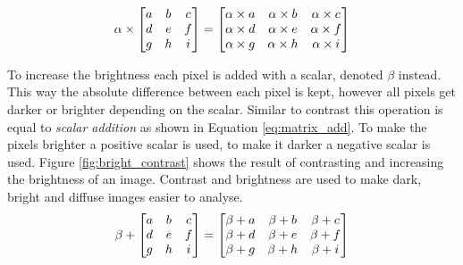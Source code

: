 \begin{equation}
\alpha \times 
\setlength{\arraycolsep}{5pt}
 \begin{bmatrix}
  a & b & c \\
  d & e & f \\
  g & h & i \\
 \end{bmatrix} =
 \setlength{\arraycolsep}{5pt} 
 \begin{bmatrix}
  \alpha \times a & \alpha \times b & \alpha \times c \\
  \alpha \times d & \alpha \times e & \alpha \times f \\
  \alpha \times g & \alpha \times h & \alpha \times i \\
 \end{bmatrix}
 \label{eq:matrix_mul}
\end{equation}

To increase the brightness each pixel is added with a scalar, denoted $\beta$ instead. This way the absolute difference between each pixel is kept, however all pixels get darker or brighter depending on the scalar. Similar to contrast this operation is equal to \textit{scalar addition} as shown in Equation \ref{eq:matrix_add}. To make the pixels brighter a positive scalar is used, to make it darker a negative scalar is used. Figure \ref{fig:bright_contrast} shows the result of contrasting and increasing the brightness of an image. Contrast and brightness are used to make dark, bright and diffuse images easier to analyse. \\

\begin{equation}
\beta + 
\setlength{\arraycolsep}{5pt}
 \begin{bmatrix}
  a & b & c \\
  d & e & f \\
  g & h & i \\
 \end{bmatrix} =
 \setlength{\arraycolsep}{5pt} 
 \begin{bmatrix}
  \beta + a & \beta + b & \beta + c \\
  \beta + d & \beta + e & \beta + f \\
  \beta + g & \beta + h & \beta + i \\
 \end{bmatrix}
 \label{eq:matrix_add}
\end{equation}

